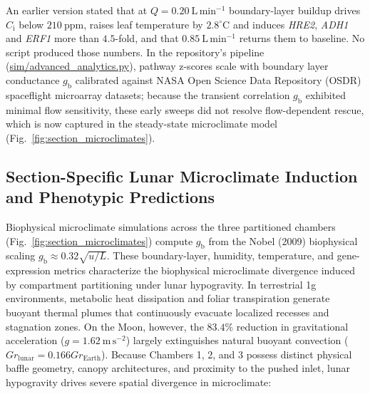 \documentclass[pdflatex,sn-nature,iicol]{sn-jnl}
\begin{document}
An earlier version stated that at $Q = 0.20\ \mathrm{L\,min^{-1}}$ boundary-layer buildup drives $C_{\mathrm{i}}$ below $210\ \mathrm{ppm}$, raises leaf temperature by $2.8^\circ\mathrm{C}$ and induces \textit{HRE2}, \textit{ADH1} and \textit{ERF1} more than $4.5$-fold, and that $0.85\ \mathrm{L\,min^{-1}}$ returns them to baseline. No script produced those numbers. In the repository's pipeline (\url{sim/advanced_analytics.py}), pathway z-scores scale with boundary layer conductance $g_{\mathrm{b}}$ calibrated against NASA Open Science Data Repository (OSDR) spaceflight microarray datasets; because the transient correlation $g_{\mathrm{b}}$ exhibited minimal flow sensitivity, these early sweeps did not resolve flow-dependent rescue, which is now captured in the steady-state microclimate model (Fig.~\ref{fig:section_microclimates}).

\subsection{Section-Specific Lunar Microclimate Induction and Phenotypic Predictions}\label{sec:section_microclimates}

Biophysical microclimate simulations across the three partitioned chambers (Fig.~\ref{fig:section_microclimates}) compute $g_{\mathrm{b}}$ from the Nobel (2009) biophysical scaling $g_{\mathrm{b}} \approx 0.32\sqrt{u/L}$. These boundary-layer, humidity, temperature, and gene-expression metrics characterize the biophysical microclimate divergence induced by compartment partitioning under lunar hypogravity. In terrestrial 1g environments, metabolic heat dissipation and foliar transpiration generate buoyant thermal plumes that continuously evacuate localized recesses and stagnation zones. On the Moon, however, the $83.4\%$ reduction in gravitational acceleration ($g = 1.62\ \mathrm{m\,s^{-2}}$) largely extinguishes natural buoyant convection ($Gr_{\mathrm{lunar}} = 0.166 Gr_{\mathrm{Earth}}$). Because Chambers 1, 2, and 3 possess distinct physical baffle geometry, canopy architectures, and proximity to the pushed inlet, lunar hypogravity drives severe spatial divergence in microclimate:
\end{document}
